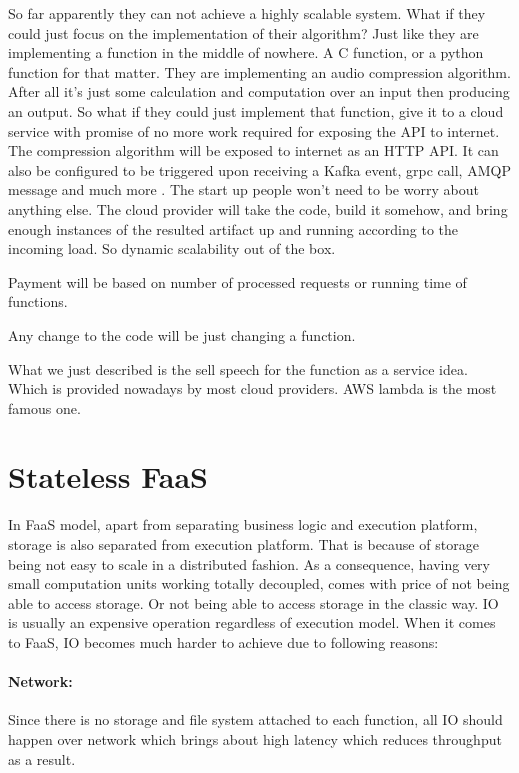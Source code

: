 \documentclass[a4]{report}
\begin{document}
    So far apparently they can not achieve a highly scalable system.
    What if they could just focus on the implementation of their algorithm?
    Just like they are implementing a function in the middle of nowhere.
    A C function, or a python function for that matter.
    They are implementing an audio compression algorithm.
    After all it's just some calculation and computation over an input then producing an output.
    So what if they could just implement that function, give it to a cloud service with promise of no more work
    required for exposing the API to internet.
    The compression algorithm will be exposed to internet as an HTTP API.
    It can also be configured to be triggered upon receiving a Kafka event, grpc call, AMQP message and much more .
    The start up people won't need to be worry about anything else.
    The cloud provider will take the code, build it somehow, and bring enough instances of the resulted artifact up and
    running according to the incoming load.
    So dynamic scalability out of the box.

    Payment will be based on number of processed requests or running time of functions.

    Any change to the code will be just changing a function.

    What we just described is the sell speech for the function as a service idea.
    Which is provided nowadays by most cloud providers.
    AWS lambda\cite{lambda} is the most famous one.


    \section{Stateless FaaS}
    In FaaS model, apart from separating business logic and execution platform, storage is also separated from
    execution platform.
    That is because of storage being not easy to scale in a distributed fashion.
    As a consequence, having very small computation units working totally decoupled, comes with price of not being
    able to access storage.
    Or not being able to access storage in the classic way.
    IO is usually an expensive operation regardless of execution model.
    When it comes to FaaS, IO becomes much harder to achieve due to following reasons:

    \paragraph{Network:} Since there is no storage and file system attached to each function, all IO should happen
    over network which brings about high latency which reduces throughput as a result.
\end{document}
